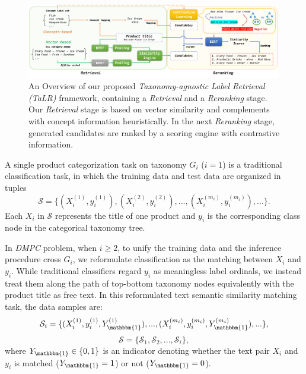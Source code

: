 \begin{figure}[thbp] \centering
    \includegraphics[width=0.99\textwidth]{aaai_fig2}
    \caption{An Overview of our proposed \textit{Taxonomy-agnostic Label Retrieval (TaLR)} framework, containing a \textit{Retrieval} and a \textit{Reranking} stage. Our \textit{Retrieval} stage is based on vector similarity and complements with concept information heuristically. In the next \textit{Reranking} stage, generated candidates are ranked by a scoring engine with contrastive information.}
    \label{fig:pipeline}
\end{figure}

A single product categorization task on taxonomy $G_i$ ($i=1$) is a traditional classification task, in which the training data and test data are organized in tuples 
$$
\mathcal{S}=\{(X_i^{(1)}, y_i^{(1)}), (X_i^{(2)}, y_i^{(2)}),...,(X_i^{(m_i)}, y_i^{(m_i)}),...\}.
$$
Each $X_i$ in $\mathcal{S}$ represents the title of one product and $y_i$ is the corresponding class node in the categorical taxonomy tree.

In \textit{DMPC} problem, when $i \geq 2$, to unify the training data and the inference procedure cross $G_i$, 
we reformulate classification as the matching between $X_i$ and $y_i$. 
While traditional classifiers regard $y_i$ as meaningless label ordinals, we instead treat them along the path of top-bottom taxonomy nodes equivalently with the product title as free text. 
In this reformulated text semantic similarity matching task, the data samples are:
$$
\mathcal{S}_i=\{(X_i^{(1)}, y_i^{(1)}, Y_{\mathbbm{1}}^{(1)}),...,(X_i^{(m_i)}, y_i^{(m_i)}, Y_{\mathbbm{1}}^{(m_i)}),...\},
$$
$$
\mathcal{S}=\{\mathcal{S}_1, \mathcal{S}_2,...,\mathcal{S}_i\},
$$
where $Y_{\mathbbm{1}}\in \{0, 1\}$ is an indicator denoting whether the text pair $X_i$ and $y_i$ is matched ($Y_{\mathbbm{1}}=1$) or not ($Y_{\mathbbm{1}}=0$).

